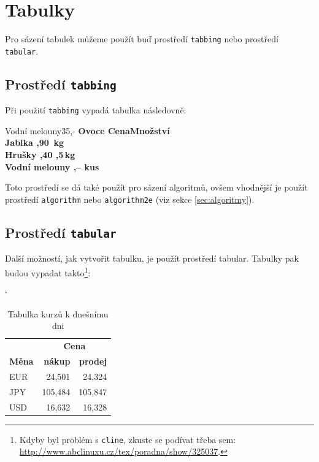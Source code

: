 \documentclass[a4paper, 11pt]{article}[01.04.2012]
\begin{document}

\section{Tabulky}
Pro sázení tabulek můžeme použít buď prostředí \texttt{tabbing} nebo prostředí \texttt{tabular}.
\subsection{Prostředí \texttt{tabbing}}
Při použití \texttt{tabbing} vypadá tabulka následovně:
\begin{tabbing}
Vodní melouny\quad \= 35,- \kill
\bf{Ovoce} \>  \bf{Cena}\quad\=  \bf{Množství}\\
Jablka ,90 \,kg\\
Hrušky ,40 ,5\,kg\\
Vodní melouny ,--  kus\\
\end{tabbing}
Toto prostředí se dá také použít pro sázení algoritmů, ovšem vhodnější je použít 
prostředí \texttt{algorithm} nebo \texttt{algorithm2e} (viz sekce \ref{sec:algoritmy}).
\subsection{Prostředí \texttt{tabular}}
Další možností, jak vytvořit tabulku, je použít prostředí tabular. Tabulky pak 
budou vypadat takto\footnote{Kdyby byl problém s \texttt{cline}, zkuste se podívat třeba sem: 
\url{http://www.abclinuxu.cz/tex/poradna/show/325037}.}:

\begin{table}[h]
  \catcode`
  \centering
  \begin{tabular}{|l|r|r|}
    \hline
     & \multicolumn{2}{|c|}{\bf{Cena}}\\ \cline{2-3}
    \bf{Měna} & \bf{nákup} & \bf{prodej}\\ \hline
    EUR & 24,501 & 24,324\\
    JPY & 105,484 & 105,847\\
    USD & 16,632 & 16,328\\ \hline
  \end{tabular}
  \caption{Tabulka kurzů k dnešnímu dni}
  \label{tab:kurzy}
\end{table}
\end{document}
